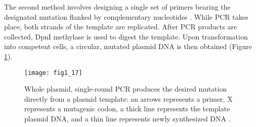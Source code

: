 \begin{refsection}
The second method involves designing a single set of primers bearing the
designated mutation flanked by complementary nucleotides \cite{Arnold2003}.
While PCR takes place, both strands of the template are replicated. After PCR
products are collected, DpnI methylase is used to digest the template.  Upon
transformation into competent cells, a circular, mutated plasmid DNA is then
obtained \cite{Antikainen2005a} (Figure \ref{fig:sdm-2}).
\begin{figure}[htbp] \centering \texttt{[image: fig1\_17]}
    \caption[Whole plasmid, single-round PCR produces the desired mutation
    directly from a plasmid template: an arrows represents a primer, X
    represents a mutagenic codon, a thick line represents the template plasmid
    DNA, and a thin line represents newly synthesized DNA.]{Whole plasmid,
        single-round PCR produces the desired mutation directly from a plasmid
        template: an arrows represents a primer, X represents a mutagenic
        codon, a thick line represents the template plasmid DNA, and a thin
        line represents newly synthesized DNA \cite{Antikainen2005a}.}
        \label{fig:sdm-2}
\end{figure}


\end{refsection}

